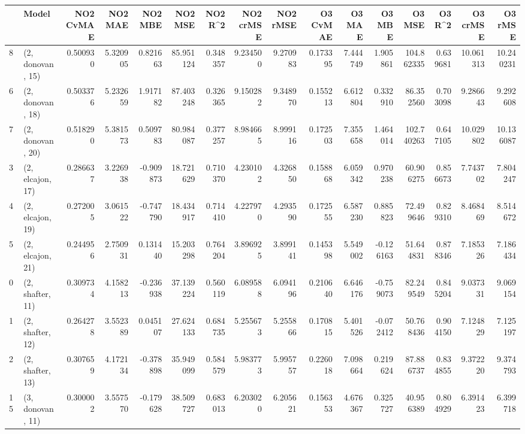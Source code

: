 \begin{tabular}{llrrrrrrrrrrrrrr}
\toprule
{} &             Model &  NO2 CvMAE &   NO2 MAE &   NO2 MBE &    NO2 MSE &   NO2 R\textasciicircum2 &  NO2 crMSE &  NO2 rMSE &  O3 CvMAE &     O3 MAE &    O3 MBE &      O3 MSE &    O3 R\textasciicircum2 &   O3 crMSE &    O3 rMSE \\
\midrule
8  &  (2, donovan, 15) &   0.500930 &  5.320905 &  0.821663 &  85.951124 &  0.348357 &   9.234500 &  9.270983 &  0.173395 &   7.444749 &  1.905861 &  104.862335 &  0.639681 &  10.061313 &  10.240231 \\
6  &  (2, donovan, 18) &   0.503376 &  5.232659 &  1.917182 &  87.403248 &  0.326365 &   9.150282 &  9.348970 &  0.155213 &   6.612804 &  0.332910 &   86.352560 &  0.703098 &   9.286643 &   9.292608 \\
7  &  (2, donovan, 20) &   0.518290 &  5.381573 &  0.509783 &  80.984087 &  0.377257 &   8.984665 &  8.999116 &  0.172503 &   7.355658 &  1.464014 &  102.740263 &  0.647105 &  10.029802 &  10.136087 \\
3  &  (2, elcajon, 17) &   0.286637 &  3.226938 & -0.909873 &  18.721629 &  0.710370 &   4.230102 &  4.326850 &  0.158868 &   6.059342 &  0.970238 &   60.906275 &  0.856673 &   7.743702 &   7.804247 \\
4  &  (2, elcajon, 19) &   0.272005 &  3.061522 & -0.747790 &  18.434917 &  0.714410 &   4.227970 &  4.293590 &  0.172555 &   6.587230 &  0.885823 &   72.499646 &  0.829310 &   8.468469 &   8.514672 \\
5  &  (2, elcajon, 21) &   0.244956 &  2.750931 &  0.131440 &  15.203298 &  0.764204 &   3.896925 &  3.899141 &  0.145398 &   5.549002 & -0.126163 &   51.644831 &  0.878346 &   7.185326 &   7.186434 \\
0  &  (2, shafter, 11) &   0.309734 &  4.158213 & -0.236938 &  37.139224 &  0.560119 &   6.089588 &  6.094196 &  0.210640 &   6.646176 & -0.759073 &   82.249549 &  0.845204 &   9.037331 &   9.069154 \\
1  &  (2, shafter, 12) &   0.264278 &  3.552389 &  0.045107 &  27.624133 &  0.684735 &   5.255673 &  5.255866 &  0.170815 &   5.401526 & -0.072412 &   50.768436 &  0.904150 &   7.124829 &   7.125197 \\
2  &  (2, shafter, 13) &   0.307659 &  4.172134 & -0.378898 &  35.949099 &  0.584579 &   5.983773 &  5.995757 &  0.226018 &   7.098664 &  0.219624 &   87.886737 &  0.834855 &   9.372220 &   9.374793 \\
15 &  (3, donovan, 11) &   0.300002 &  3.557570 & -0.179628 &  38.509727 &  0.683013 &   6.203020 &  6.205621 &  0.156353 &   4.676367 &  0.325727 &   40.956389 &  0.804929 &   6.391423 &   6.399718 \\

\end{tabular}
